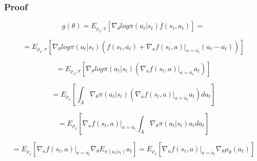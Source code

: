\documentclass{beamer}
\begin{document}
\begin{frame}[t]
\frametitle{Proof}

\begin{equation}
g(\theta) = E_{\rho_\pi, \pi} \left[ \nabla_\theta log \pi(a_t | s_t) \overline{f} (s_t, a_t) \right] =
\end{equation}

\begin{equation}
= E_{\rho_\pi, \pi} \left[ \nabla_\theta log \pi(a_t | s_t) (f (s_t, \overline{a_t}) + 
\nabla_a f(s_t, a) |_{a=\overline{a_t}} (a_t - \overline{a_t})) \right]
\end{equation}

\begin{equation}
= E_{\rho_\pi, \pi} \left[ \nabla_\theta log \pi(a_t | s_t) ( 
\nabla_a f(s_t, a) |_{a=\overline{a_t}} a_t) \right]
\end{equation}

\begin{equation}
= E_{\rho_\pi} \left[ \int_{A} \nabla_\theta \pi(a_t | s_t) ( 
\nabla_a f(s_t, a) |_{a=\overline{a_t}} a_t) da_t \right]
\end{equation}

\begin{equation}
= E_{\rho_\pi} \left[ \nabla_a f(s_t, a) |_{a=\overline{a_t}} \int_{A} \nabla_\theta \pi(a_t | s_t) a_t da_t \right]
\end{equation}

\begin{equation}
= E_{\rho_\pi} \left[ \nabla_a f(s_t, a) |_{a=\overline{a_t}} \nabla_\theta E_{\pi(a_t | s_t)} a_t \right] = E_{\rho_\pi} \left[ \nabla_a f(s_t, a) |_{a=\overline{a_t}} \nabla_\theta \mu_\theta(a_t) \right]
\end{equation}

\end{frame}
\end{document}
